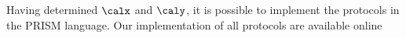 Having determined $\calx$ and $\caly$, it is possible to implement
the protocols in the PRISM language. Our implementation of all protocols
are available online \cite{link}
% 
%
%
%	
%
%
